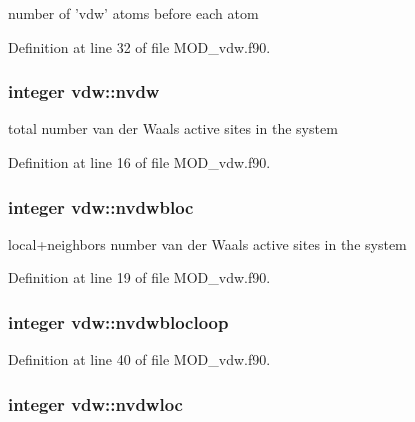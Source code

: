 number of 'vdw' atoms before each atom 



Definition at line 32 of file M\-O\-D\-\_\-vdw.\-f90.

\hypertarget{classvdw_ab188e58125273df95e334decf7db12f3}{
\subsubsection[{nvdw}]{\setlength{\rightskip}{0pt plus 5cm}integer vdw\-::nvdw}}\label{classvdw_ab188e58125273df95e334decf7db12f3}


total number van der Waals active sites in the system 



Definition at line 16 of file M\-O\-D\-\_\-vdw.\-f90.

\hypertarget{classvdw_ade4cf6b2078920c6220e9dbe93fc597c}{
\subsubsection[{nvdwbloc}]{\setlength{\rightskip}{0pt plus 5cm}integer vdw\-::nvdwbloc}}\label{classvdw_ade4cf6b2078920c6220e9dbe93fc597c}


local+neighbors number van der Waals active sites in the system 



Definition at line 19 of file M\-O\-D\-\_\-vdw.\-f90.

\hypertarget{classvdw_a743bd22f09805770b61b2fccc4a7f0ac}{
\subsubsection[{nvdwblocloop}]{\setlength{\rightskip}{0pt plus 5cm}integer vdw\-::nvdwblocloop}}\label{classvdw_a743bd22f09805770b61b2fccc4a7f0ac}


Definition at line 40 of file M\-O\-D\-\_\-vdw.\-f90.

\hypertarget{classvdw_a53b9f8a5df5936b34ec6e5eef165f7d8}{
\subsubsection[{nvdwloc}]{\setlength{\rightskip}{0pt plus 5cm}integer vdw\-::nvdwloc}}\label{classvdw_a53b9f8a5df5936b34ec6e5eef165f7d8}


